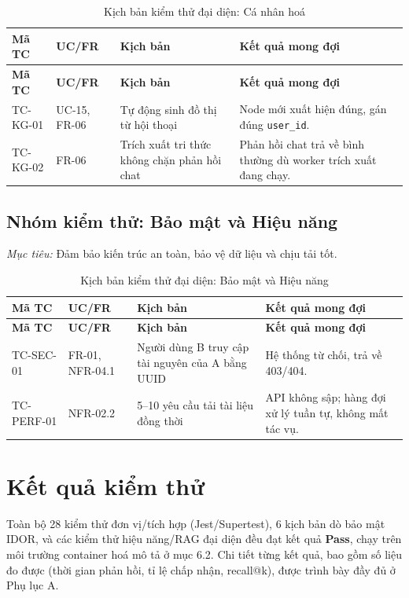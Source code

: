\begin{longtable}{|C{0.15\textwidth}|C{0.15\textwidth}|L{0.27\textwidth}|L{0.31\textwidth}|}
\caption{Kịch bản kiểm thử đại diện: Cá nhân hoá}\\
\hline
\textbf{Mã TC} & \textbf{UC/FR} & \textbf{Kịch bản} & \textbf{Kết quả mong đợi} \\\hline
\endfirsthead
\hline
\textbf{Mã TC} & \textbf{UC/FR} & \textbf{Kịch bản} & \textbf{Kết quả mong đợi} \\\hline
\endhead
\mbox{TC-KG-01} & UC-15, FR-06 & Tự động sinh đồ thị từ hội thoại & Node mới xuất hiện đúng, gán đúng \texttt{user\_id}. \\\hline
\mbox{TC-KG-02} & FR-06 & Trích xuất tri thức không chặn phản hồi chat & Phản hồi chat trả về bình thường dù worker trích xuất đang chạy. \\\hline
\end{longtable}

\subsection{Nhóm kiểm thử: Bảo mật và Hiệu năng}
\textit{Mục tiêu:} Đảm bảo kiến trúc an toàn, bảo vệ dữ liệu và chịu tải tốt.

\newpage
\begin{longtable}{|C{0.15\textwidth}|C{0.15\textwidth}|L{0.27\textwidth}|L{0.31\textwidth}|}
\caption{Kịch bản kiểm thử đại diện: Bảo mật và Hiệu năng}\\
\hline
\textbf{Mã TC} & \textbf{UC/FR} & \textbf{Kịch bản} & \textbf{Kết quả mong đợi} \\\hline
\endfirsthead
\hline
\textbf{Mã TC} & \textbf{UC/FR} & \textbf{Kịch bản} & \textbf{Kết quả mong đợi} \\\hline
\endhead
\mbox{TC-SEC-01} & FR-01, NFR-04.1 & Người dùng B truy cập tài nguyên của A bằng UUID & Hệ thống từ chối, trả về 403/404. \\\hline
\mbox{TC-PERF-01} & NFR-02.2 & 5--10 yêu cầu tải tài liệu đồng thời & API không sập; hàng đợi xử lý tuần tự, không mất tác vụ. \\\hline
\end{longtable}

\section{Kết quả kiểm thử}
Toàn bộ 28 kiểm thử đơn vị/tích hợp (Jest/Supertest), 6 kịch bản dò bảo mật IDOR, và các kiểm thử hiệu năng/RAG đại diện đều đạt kết quả \textbf{Pass}, chạy trên môi trường container hoá mô tả ở mục 6.2. Chi tiết từng kết quả, bao gồm số liệu đo được (thời gian phản hồi, tỉ lệ chấp nhận, recall@k), được trình bày đầy đủ ở Phụ lục A.
